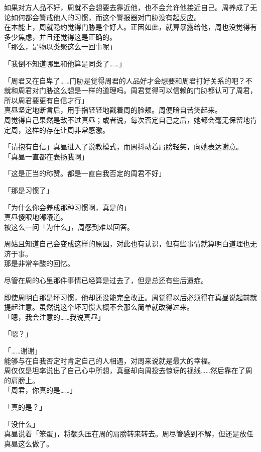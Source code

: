 如果对方人品不好，周就不会想要去靠近他，也不会允许他接近自己。周养成了无论如何都会警戒他人的习惯，而这个警报器对门胁没有起反应。\\

在本能上，周就隐约觉得门胁是个好人。正因如此，就算暴露给他，周也没觉得有多少焦虑，并且还觉得这是正确的。\\

「那么，是物以类聚这么一回事呢」

「我倒不知道哪里和他算是同类了……」

「周君又在自卑了……门胁是觉得周君的人品好才会想要和周君打好关系的吧？不就和周君对门胁这么想是一样的道理吗。周君觉得可以信赖的门胁都认可了周君，所以周君要更有自信才行」\\

真昼坚定地断言后，用手指轻轻地戳着周的脸颊。周便暗自苦笑起来。\\

周觉得自己果然是敌不过真昼；或者说，每次否定自己之后，她都会毫无保留地肯定周，这样的存在让周非常感激。

「请抱有自信」真昼进入了说教模式，而周抖动着肩膀轻笑，向她表达谢意。\\

「真昼一直都在表扬我啊」

「这是正当的称赞。都是一直自我否定的周君不好」

「那是习惯了」

「为什么你会养成那种习惯啊，真是的」\\

真昼傻眼地嘟囔道。\\

被这么一问「为什么」，周感到难以回答。

周姑且知道自己会变成这样的原因，对此也有认识，但有些事情就算明白道理也无济于事。\\

那是非常辛酸的回忆。

尽管在周的心里那件事情已经算是过去了，但是总还有些后遗症。

即使周明白那是坏习惯，他却还没能完全改正。周觉得以后必须得在真昼说起前就提起注意。虽然说这个坏习惯大概不会那么简单就改得过来。\\

「嗯，我会注意的……我说真昼」

「嗯？」

「……谢谢」\\

能够与在自我否定时肯定自己的人相遇，对周来说就是最大的幸福。\\

周仅仅是坦率说出了自己心中所想，真昼却向周投去惊讶的视线……然后靠在了周的肩膀上。\\

「周君，你真的是……」

「真的是？」

「没什么」\\

真昼说着「笨蛋」，将额头压在周的肩膀转来转去。周尽管感到不解，但还是放任真昼这么做了。
